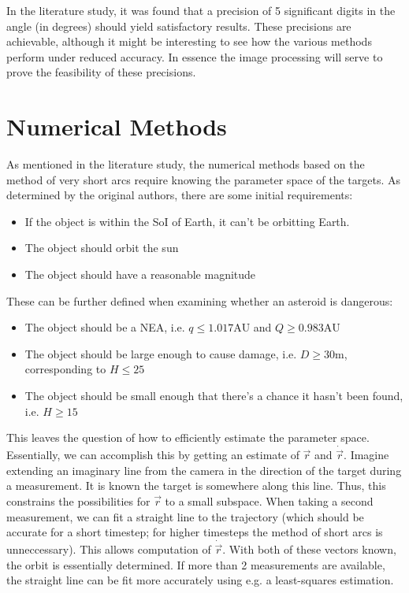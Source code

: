 \documentclass[a4paper,10pt]{article}
\begin{document}
In the literature study, it was found that a precision of 5 significant digits in the angle (in degrees) should yield satisfactory results. These precisions are achievable, although it might be interesting to see how the various methods perform under reduced accuracy. In essence the image processing will serve to prove the feasibility of these precisions.

\section{Numerical Methods}

As mentioned in the literature study, the numerical methods based on the method of very short arcs require knowing the parameter space of the targets. As determined by the original authors, there are some initial requirements:
\begin{itemize}
 \item If the object is within the SoI of Earth, it can't be orbitting Earth.
 \item The object should orbit the sun
 \item The object should have a reasonable magnitude
\end{itemize}
These can be further defined when examining whether an asteroid is dangerous:
\begin{itemize}
 \item The object should be a NEA, i.e. $q \leq 1.017\mathrm{AU}$ and $Q \geq 0.983\mathrm{AU}$
 \item The object should be large enough to cause damage, i.e. $D\geq30\mathrm{m}$, corresponding to $H \leq 25$
 \item The object should be small enough that there's a chance it hasn't been found, i.e. $H \geq 15$
\end{itemize}

This leaves the question of how to efficiently estimate the parameter space. Essentially, we can accomplish this by getting an estimate of $\vec{r}$ and $\dot{\vec{r}}$. Imagine extending an imaginary line from the camera in the direction of the target during a measurement. It is known the target is somewhere along this line. Thus, this constrains the possibilities for $\vec{r}$ to a small subspace. When taking a second measurement, we can fit a straight line to the trajectory (which should be accurate for a short timestep; for higher timesteps the method of short arcs is unneccessary). This allows computation of $\dot{\vec{r}}$. With both of these vectors known, the orbit is essentially determined. If more than 2 measurements are available, the straight line can be fit more accurately using e.g. a least-squares estimation.\\
\end{document}
